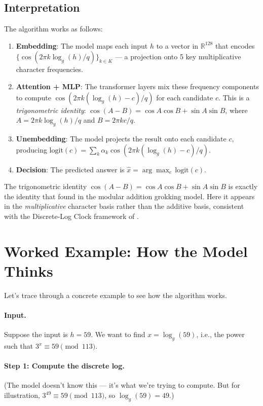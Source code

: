 \documentclass[11pt]{article}
\newcommand{\R}{\mathbb{R}}
\newcommand{\logg}{\log_g}
\begin{document}
\subsection{Interpretation}

The algorithm works as follows:
\begin{enumerate}[leftmargin=*]
    \item \textbf{Embedding}: The model maps each input $h$ to a vector in $\R^{128}$ that encodes $\{\cos(2\pi k \logg(h)/q)\}_{k \in K}$ — a projection onto 5 key multiplicative character frequencies.
    \item \textbf{Attention + MLP}: The transformer layers mix these frequency components to compute $\cos(2\pi k (\logg(h) - c)/q)$ for each candidate $c$. This is a \emph{trigonometric identity}: $\cos(A - B) = \cos A \cos B + \sin A \sin B$, where $A = 2\pi k \logg(h)/q$ and $B = 2\pi k c/q$.
    \item \textbf{Unembedding}: The model projects the result onto each candidate $c$, producing $\text{logit}(c) = \sum_k \alpha_k \cos(2\pi k (\logg(h) - c)/q)$.
    \item \textbf{Decision}: The predicted answer is $\hat{x} = \arg\max_c \, \text{logit}(c)$.
\end{enumerate}

The trigonometric identity $\cos(A - B) = \cos A \cos B + \sin A \sin B$ is exactly the identity that \citet{nanda2023progress} found in the modular addition grokking model. Here it appears in the \emph{multiplicative} character basis rather than the additive basis, consistent with the Discrete-Log Clock framework of \citet{doshi2024discrete}.


\section{Worked Example: How the Model Thinks}

Let's trace through a concrete example to see how the algorithm works.

\paragraph{Input.} Suppose the input is $h = 59$. We want to find $x = \logg(59)$, i.e., the power such that $3^x \equiv 59 \pmod{113}$.

\paragraph{Step 1: Compute the discrete log.} (The model doesn't know this — it's what we're trying to compute. But for illustration, $3^{49} \equiv 59 \pmod{113}$, so $\logg(59) = 49$.)
\end{document}
